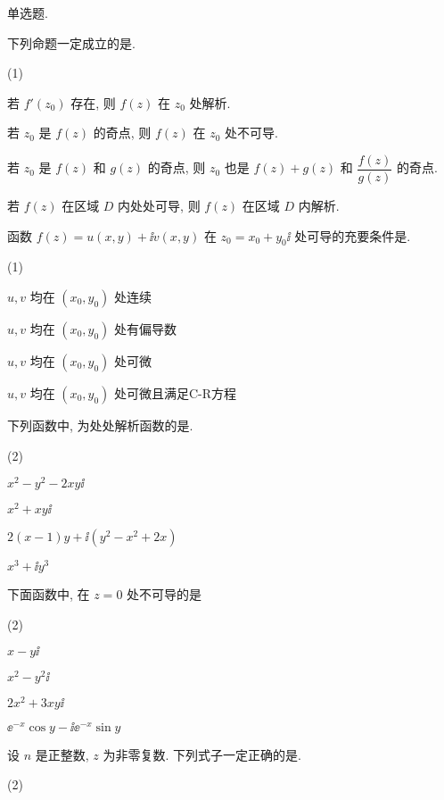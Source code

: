 \begin{homework}
  \item 单选题.
  \begin{homework}
    \item 下列命题一定成立的是\fillbrace{}.
    \begin{exchoice}(1)
      \item 若 $f'(z_0)$ 存在, 则 $f(z)$ 在 $z_0$ 处解析.
      \item 若 $z_0$ 是 $f(z)$ 的奇点, 则 $f(z)$ 在 $z_0$ 处不可导.
      \item 若 $z_0$ 是 $f(z)$ 和 $g(z)$ 的奇点, 则 $z_0$ 也是 $f(z)+g(z)$ 和 $\dfrac{f(z)}{g(z)}$ 的奇点.
      \item 若 $f(z)$ 在区域 $D$ 内处处可导, 则 $f(z)$ 在区域 $D$ 内解析.
    \end{exchoice}
    \item 函数 $f(z)=u(x,y)+\ii v(x,y)$ 在 $z_0=x_0+y_0\ii$ 处可导的充要条件是\fillbrace{}.
    \begin{exchoice}(1)
      \item $u,v$ 均在 $(x_0,y_0)$ 处连续
      \item $u,v$ 均在 $(x_0,y_0)$ 处有偏导数
      \item $u,v$ 均在 $(x_0,y_0)$ 处可微
      \item $u,v$ 均在 $(x_0,y_0)$ 处可微且满足C-R方程
    \end{exchoice}
    \item 下列函数中, 为处处解析函数的是\fillbrace{}.
    \begin{exchoice}(2)
      \item $x^2-y^2-2xy\ii$
      \item $x^2+xy\ii$
      \item $2(x-1)y+\ii(y^2-x^2+2x)$
      \item $x^3+\ii y^3$
    \end{exchoice}
    \item 下面函数中, 在 $z=0$ 处不可导的是\fillbrace{}
    \begin{exchoice}(2)
      \item $x-y\ii$
      \item $x^2-y^2\ii$
      \item $2x^2+3xy\ii$
      \item $\ee^{-x}\cos y-\ii \ee^{-x}\sin y$
    \end{exchoice}
    \item 设 $n$ 是正整数, $z$ 为非零复数. 下列式子一定正确的是\fillbrace{}.
    \begin{exchoice}(2)

\end{exchoice}
\end{homework}
\end{homework}

